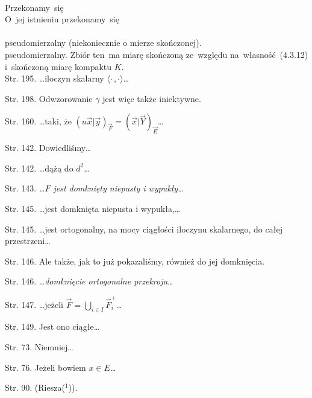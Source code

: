 \documentclass[a4paper,11pt]{article}
\begin{document}
 \\
\Jest Przekonamy~się \\
\Pow  O~jej istnieniu przekonamy~się \\
 \\
\Jest pseudomierzalny (niekoniecznie o mierze skończonej). \\
\Pow pseudomierzalny. Zbiór ten~ma miarę skończoną ze~względu
na~własność~(4.3.12) i~skończoną miarę kompaktu $K$. \\






















\start Str. 195. \ldots iloczyn skalarny
$\langle \cdot \,, \cdot \rangle$\ldots

\start Str. 198. Odwzorowanie $\gamma$ jest więc także iniektywne.

\start Str. 160. \ldots taki, że
$( u\vec{ x } | \vec{ y } )_{ \vec{ F } } = ( \vec{ x } | \vec{ Y }
)_{ \vec{ E } }$\ldots

\start Str. 142. Dowiedliśmy\ldots

\start Str. 142. \ldots dążą do $d^{ 2 }$\ldots

\start Str. 143. \emph{\ldots$F$ jest domknięty niepusty i
  wypukły\ldots}

\start Str. 145. \ldots jest domknięta niepusta i wypukła,\ldots

\start Str. 145. \ldots jest ortogonalny, na mocy ciągłości iloczynu
skalarnego, do całej przestrzeni\ldots

\start Str. 146. Ale także, jak to już pokazaliśmy, również do jej
domknięcia.

\start Str. 146. \ldots\emph{domknięcie ortogonalne przekroju}\ldots

\start Str. 147. \ldots jeżeli
$\vec{ F } = \bigcup_{ i \in I } \vec{ F }_{ i }^{ + }$\ldots

\start Str. 149. Jest ono ciągłe\ldots

\start Str. 73. Niemniej\ldots

\start Str. 76. Jeżeli bowiem $x \in E$\ldots

\start Str. 90. \large{(Riesza($^{ 1 }$))}.
\end{document}
